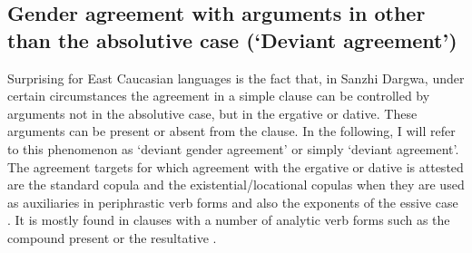 
\subsection{Gender agreement with arguments in other than the absolutive case (`Deviant agreement')}
\label{ssec:Gender agreement with arguments in other than the absolutive case}

Surprising for East Caucasian languages is the fact that, in Sanzhi Dargwa, under certain circumstances the agreement in a simple clause can be controlled by arguments not in the absolutive case, but in the ergative or dative. These arguments can be present or absent from the clause. In the following, I will refer to this phenomenon as ‘deviant gender agreement' or simply ‘deviant agreement'. The agreement targets for which agreement with the ergative or dative is attested are the standard copula  and the existential/locational copulas  when they are used as auxiliaries in periphrastic verb forms and also the exponents of the essive case . It is mostly found in clauses with a number of analytic verb forms such as the compound present  or the resultative . 


